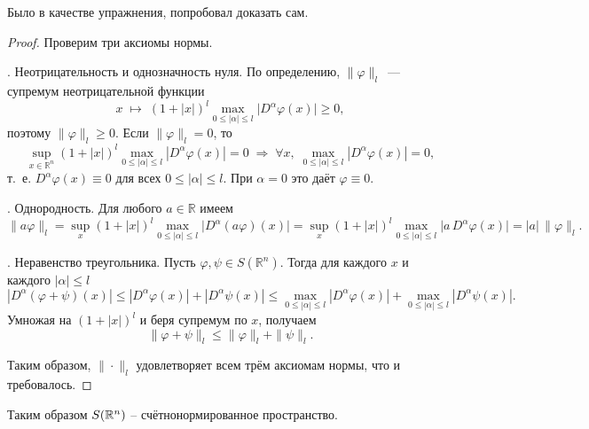 \begin{note}
    Было в качестве упражнения, попробовал доказать сам.
\end{note}

\begin{proof}
    Проверим три аксиомы нормы.

    \medskip
    . Неотрицательность и однозначность нуля.
    По определению, \(\|\varphi\|_l\)~--- супремум неотрицательной функции
    \[
        x\;\mapsto\;(1+|x|)^l \max_{0 \le |\alpha|\le l}\bigl|D^\alpha\varphi(x)\bigr|\ge0,
    \]
    поэтому \(\|\varphi\|_l\ge0\). Если \(\|\varphi\|_l=0\), то
    \[
        \sup_{x\in\mathbb{R}^n}(1+|x|)^l\max_{0 \le |\alpha|\le l}|D^\alpha\varphi(x)|=0
        \;\Longrightarrow\;
        \forall x,\;\max_{0 \le |\alpha|\le l}|D^\alpha\varphi(x)|=0,
    \]
    т.~е. \(D^\alpha\varphi(x)\equiv0\) для всех \(0 \le |\alpha|\le l\). При \(\alpha=0\) это даёт \(\varphi\equiv0\).

    \medskip
    . Однородность.
    Для любого \(a\in\mathbb{R}\) имеем
    \[
        \|a\varphi\|_l
        =\sup_x(1+|x|)^l\max_{0 \le |\alpha|\le l}\bigl|D^\alpha(a\varphi)(x)\bigr|
        =\sup_x(1+|x|)^l\max_{0 \le |\alpha|\le l}\bigl|a\,D^\alpha\varphi(x)\bigr|
        =|a|\,\|\varphi\|_l.
    \]

    \medskip
    . Неравенство треугольника.
    Пусть \(\varphi,\psi\in S(\mathbb{R}^n)\). Тогда для каждого \(x\) и каждого \(|\alpha|\le l\)
    \[
        |D^\alpha(\varphi+\psi)(x)|
        \le|D^\alpha\varphi(x)|+|D^\alpha\psi(x)|
        \le\max_{0 \le |\alpha|\le l}|D^\alpha\varphi(x)|+\max_{0 \le |\alpha|\le l}|D^\alpha\psi(x)|.
    \]
    Умножая на \((1+|x|)^l\) и беря супремум по \(x\), получаем
    \[
        \|\varphi+\psi\|_l
        \le\|\varphi\|_l+\|\psi\|_l.
    \]

    Таким образом, \(\|\cdot\|_l\) удовлетворяет всем трём аксиомам нормы, что и требовалось.
\end{proof}
\begin{note}
    Таким образом $S(\mathbb{R}^n)$ -- счётнонормированное пространство.
\end{note}

